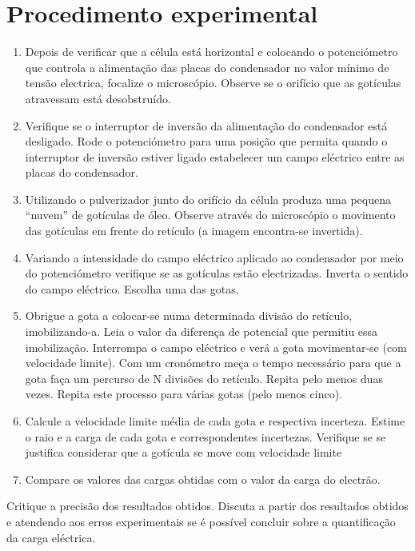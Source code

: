 \documentclass[a4paper,twoside,12pt]{article}      %
\begin{document}
\section{\sf Procedimento experimental}

\begin{enumerate}
\item   Depois de verificar que a célula está horizontal e colocando o potenciómetro que 
controla a alimentação das placas do condensador no valor mínimo de tensão electrica,
focalize o microscópio. Observe se o orifício que as gotículas atravessam está 
desobstruído.
\item    Verifique se o interruptor de inversão da alimentação do condensador está desligado.
Rode o potenciómetro para uma posição que permita quando o interruptor de inversão
estiver ligado estabelecer um campo eléctrico entre as placas do condensador. 
\item     Utilizando o pulverizador junto do orifício da célula produza uma pequena “nuvem”
de gotículas de óleo. Observe através do microscópio o movimento das gotículas em 
frente do retículo (a imagem encontra-se invertida).
\item     Variando a intensidade do campo eléctrico aplicado ao condensador por meio do 
potenciómetro verifique se as gotículas estão electrizadas. Inverta o sentido do campo 
eléctrico. Escolha uma das gotas.
 \item Obrigue a gota a colocar-se numa determinada divisão do retículo, imobilizando-a. 
Leia o valor da diferença de potencial que permitiu essa imobilização. Interrompa o 
campo eléctrico e verá a gota movimentar-se (com velocidade limite). Com um 
cronómetro meça o tempo necessário para que a gota faça um percurso de N divisões
do retículo. Repita pelo menos duas vezes. Repita este processo para várias gotas (pelo 
menos cinco). 
\item   Calcule a velocidade limite média de cada gota e respectiva incerteza. Estime o raio e 
a carga de cada gota e correspondentes incertezas. Verifique se se justifica considerar 
que a gotícula se move com velocidade limite 
\item   Compare os valores das cargas obtidas com o valor da carga do electrão.
\end{enumerate}

Critique a precisão dos resultados obtidos. Discuta a partir dos resultados obtidos e atendendo
aos erros experimentais se é possível concluir sobre a quantificação da carga eléctrica.
\end{document}
